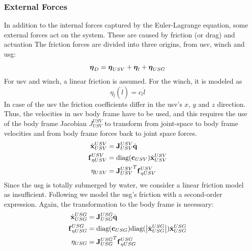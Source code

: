 \documentclass[a4paper,11pt]{article}
\newcommand{\Mat}[1]{\mathbf{\MakeUppercase{#1}}}
\renewcommand{\vec}[1]{\boldsymbol{\mathbf{\MakeLowercase{#1}}}}
\newcommand{\abs}[1]{\left|{#1}\right|}
\begin{document}
\subsubsection{External Forces}
In addition to the internal forces captured by the Euler-Lagrange equation, some external forces act on the system. These are caused by friction (or drag) and actuation   
The friction forces are divided into three origins, from \gls{usv}, winch and \gls{usg}:
\begin{equation}
\vec{\eta}_D = \vec{\eta}_{USV} + \vec{\eta}_{l} + \vec{\eta}_{USG}
\end{equation}
For \gls{usv} and winch, a linear friction is assumed. For the winch, it is modeled as
\begin{equation}
\eta_{l}(\dot{l}) = c_l \dot{l}
\end{equation}
In case of the \gls{usv} the friction coefficients differ in the \gls{usv}'s $x$, $y$ and $z$ direction. Thus, the velocities in \gls{usv} body frame have to be used, and this requires the use of the body frame Jacobian $J_{USV}^{USV}$   to transform from joint-space to body frame velocities and from body frame forces back to joint space forces. %
\begin{subequations}
	\begin{align}
	\dot{\vec{x}}_{USV}^{USV} &= \Mat{J}_{USV}^{USV} \dot{\vec{q}}
	\\
	\vec{{F}}_{\eta USV}^{USV} &= \text{diag}(\vec{c}_{USV}) \dot{\vec{x}}_{USV}^{USV}
	\\
	\eta_{USV} &= {\Mat{J}_{USV}^{USV}}^T  \vec{{F}}_{\eta USV}^{USV}
	\end{align}
\end{subequations}
%
Since the \gls{usg} is totally submerged by water, we consider a linear friction model as insufficient. Following \cite{origane2025risk} we model the \gls{usg}'s friction with a second-order expression. Again, the transformation to the body frame is necessary:
\begin{subequations}
	\begin{align}
	\dot{\vec{x}}_{USG}^{USG} &= \Mat{J}_{USG}^{USG} \dot{\vec{q}}
	\\
	\vec{{F}}_{\eta USG}^{USG} &= \text{diag}(\vec{c}_{USG}) \text{diag}(\abs{\dot{\vec{x}}_{USG}^{USG}}) \dot{\vec{x}}_{USG}^{USG}
	\\
	\eta_{USG} &= {\Mat{J}_{USG}^{USG}}^T \vec{{F}}_{\eta USG}^{USG}
	\end{align}
\end{subequations}
\end{document}

